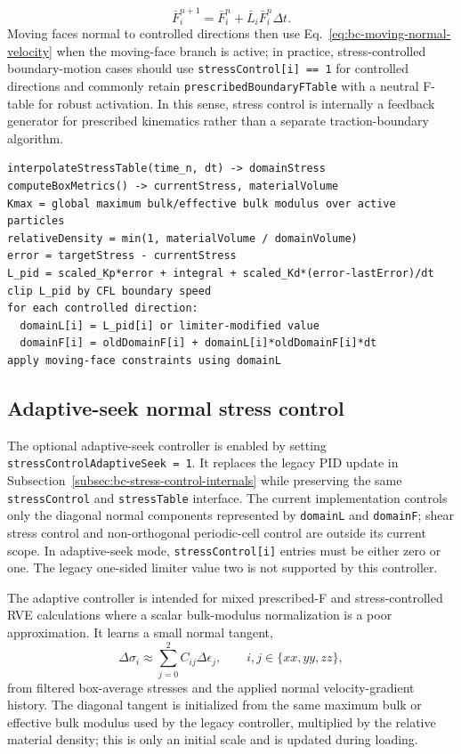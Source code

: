\begin{equation}
  \bar F_i^{n+1}=\bar F_i^n+\bar L_i\bar F_i^n\Delta t.
\end{equation}
Moving faces normal to controlled directions then use Eq.~\eqref{eq:bc-moving-normal-velocity} when the moving-face branch is active; in practice, stress-controlled boundary-motion cases should use \texttt{stressControl[i] == 1} for controlled directions and commonly retain \texttt{prescribedBoundaryFTable} with a neutral F-table for robust activation.  In this sense, stress control is internally a feedback generator for prescribed kinematics rather than a separate traction-boundary algorithm.

\begin{lstlisting}[caption={Stress-control path to boundary motion.}]
interpolateStressTable(time_n, dt) -> domainStress
computeBoxMetrics() -> currentStress, materialVolume
Kmax = global maximum bulk/effective bulk modulus over active particles
relativeDensity = min(1, materialVolume / domainVolume)
error = targetStress - currentStress
L_pid = scaled_Kp*error + integral + scaled_Kd*(error-lastError)/dt
clip L_pid by CFL boundary speed
for each controlled direction:
  domainL[i] = L_pid[i] or limiter-modified value
  domainF[i] = oldDomainF[i] + domainL[i]*oldDomainF[i]*dt
apply moving-face constraints using domainL
\end{lstlisting}

\subsection{Adaptive-seek normal stress control}
\label{subsec:bc-adaptive-seek-stress-control}

The optional adaptive-seek controller is enabled by setting
\texttt{stressControlAdaptiveSeek = 1}.  It replaces the legacy PID update in
Subsection~\ref{subsec:bc-stress-control-internals} while preserving the same
\texttt{stressControl} and \texttt{stressTable} interface.  The current
implementation controls only the diagonal normal components represented by
\texttt{domainL} and \texttt{domainF}; shear stress control and non-orthogonal
periodic-cell control are outside its current scope.  In adaptive-seek mode,
\texttt{stressControl[i]} entries must be either zero or one.  The legacy
one-sided limiter value two is not supported by this controller.

The adaptive controller is intended for mixed prescribed-F and stress-controlled
RVE calculations where a scalar bulk-modulus normalization is a poor
approximation.  It learns a small normal tangent,
\begin{equation}
  \Delta\sigma_i \approx \sum_{j=0}^{2} C_{ij}\Delta\epsilon_j,
  \qquad i,j\in\{xx,yy,zz\},
  \label{eq:bc-adaptive-seek-tangent}
\end{equation}
from filtered box-average stresses and the applied normal velocity-gradient
history.  The diagonal tangent is initialized from the same maximum bulk or
effective bulk modulus used by the legacy controller, multiplied by the relative
material density; this is only an initial scale and is updated during loading.

